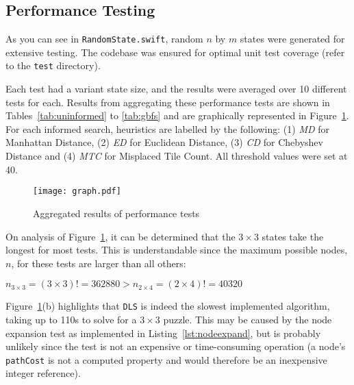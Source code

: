 \subsection{Performance Testing}
\label{sub:randomstategeneration}

As you can see in \texttt{RandomState.swift}, random $n$ by $m$ states were
generated for extensive testing. The codebase was ensured for optimal unit test
coverage (refer to the \texttt{test} directory).

Each test had a variant state size, and the results were averaged over 10
different tests for each. Results from aggregating these performance tests are
shown in Tables~\ref{tab:uninformed} to \ref{tab:gbfs} and are graphically
represented in Figure~\ref{fig:results}. For each informed search, heuristics
are labelled by the following: (1) \emph{MD} for Manhattan Distance, (2)
\emph{ED} for Euclidean Distance, (3) \emph{CD} for Chebyshev Distance and
(4) \emph{MTC} for Misplaced Tile Count. All threshold values were set at 40.

\begin{figure}[h!]
  \centering
  \texttt{[image: graph.pdf]}
  \caption{Aggregated results of performance tests}
  \label{fig:results}
\end{figure}

On analysis of Figure~\ref{fig:results}, it can be determined that the $3 \times 3$
states take the longest for most tests. This is understandable since the maximum
possible nodes, $n$, for these tests are larger than all others:


\begin{center}
  \vspace{0.5em}
  \noindent
  $n_{3 \times 3} = ( 3 \times 3 )! = 362880 > n_{2 \times 4} = ( 2 \times 4 )! = 40320$
  \vspace{0.5em}
\end{center}

Figure~\ref{fig:results}(b) highlights that \texttt{DLS} is indeed the slowest
implemented algorithm, taking up to 110s to solve for a $3 \times 3$ puzzle. This
may be caused by the node expansion test as implemented in Listing~\ref{lst:nodeexpand},
but is probably unlikely since the test is not an expensive or time-consuming
operation (a node's \texttt{pathCost} is not a computed property and would therefore
be an inexpensive integer reference).




